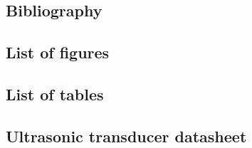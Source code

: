 \pagebreak



\thispagestyle{empty}
\begin{minipage}[c][\textheight]	{\textwidth}
	\thispagestyle{empty}
	\begin{center}
	\end{center}
\end{minipage}

\pagebreak
\appendix
\renewcommand \thesubsection {\Roman{subsection}}



\renewcommand{\refname}{}
\subsection{Bibliography}

%
\printbibliography
%
\pagebreak

\renewcommand\listfigurename{}
\subsection{List of figures}
\listoffigures
\pagebreak

\renewcommand\listtablename{}
\subsection{List of tables}
\listoftables
\pagebreak


\pagebreak

\pagebreak
\subsection{Ultrasonic transducer datasheet}
\label{app:datasheetUST}


